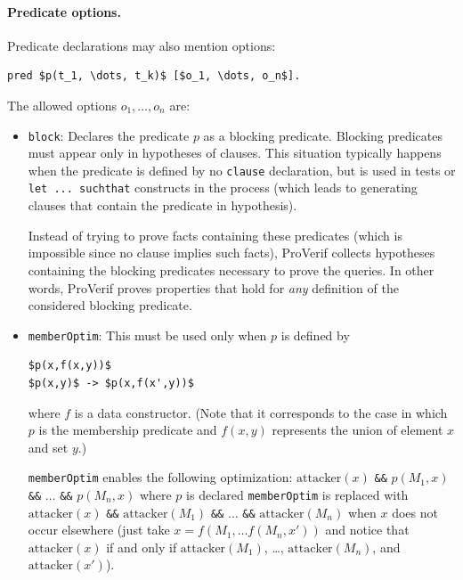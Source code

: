 \documentclass{book}
\begin{document}
\paragraph{Predicate options.}
Predicate declarations may also mention options:
\begin{lstlisting}[numbers=none]
	pred $p(t_1, \dots, t_k)$ [$o_1, \dots, o_n$].
\end{lstlisting}
The allowed options $o_1, \dots, o_n$ are:
\begin{itemize}

\item \lstinline{block}:
Declares the predicate $p$ as a blocking predicate.
Blocking predicates must appear only in hypotheses of clauses.
This situation typically happens when the predicate is defined by
no \lstinline!clause! declaration, but is used in tests or
\lstinline!let ... suchthat! constructs in the process (which leads to
generating clauses that contain the predicate in hypothesis).

Instead of trying to prove facts containing
these predicates (which is impossible since no clause implies such
facts), ProVerif collects hypotheses containing the blocking
predicates necessary to prove the queries.
In other words, ProVerif proves properties that hold for \emph{any}
definition of the considered blocking predicate.

\item \lstinline{memberOptim}:
This must be used only when $p$ is defined by
\begin{lstlisting}[numbers=none]
$p(x,f(x,y))$
$p(x,y)$ -> $p(x,f(x',y))$
\end{lstlisting}
where $f$ is a data constructor. (Note that it corresponds
to the case in which $p$ is the membership predicate and
$f(x,y)$ represents the union of element $x$ and set $y$.)

\newcommand{\ppred}{\mathrm{attacker}}

\lstinline{memberOptim} enables the following
optimization: $\ppred(x)$ \lstinline{&&} $p(M_1,x)$ \lstinline{&&} $\ldots$ \lstinline{&&} $p(M_n,x)$
where $p$ is declared \lstinline{memberOptim} is replaced with
$\ppred(x)$ \lstinline{&&} $\ppred(M_1)$ \lstinline{&&} $\ldots$ \lstinline{&&} $\ppred(M_n)$
when $x$ does not occur elsewhere (just
take $x = f(M_1, \ldots f(M_n, x'))$ and notice that $\ppred(x)$ if and
only if $\ppred(M_1)$, \ldots, $\ppred(M_n)$, and $\ppred(x')$).

\end{itemize}
\end{document}
